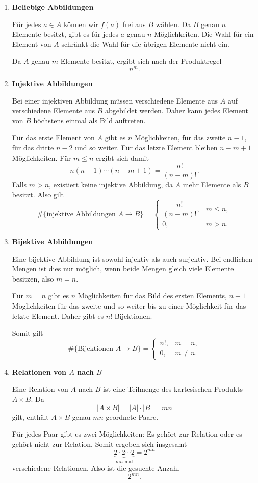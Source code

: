 \documentclass{report}
\begin{document}
\sol
\begin{enumerate}[label=(\alph*)]
  \item \textbf{Beliebige Abbildungen}

  Für jedes \(a\in A\) können wir \(f(a)\) frei aus \(B\) wählen. Da \(B\) genau \(n\) Elemente besitzt, gibt es für jedes \(a\) genau \(n\) Möglichkeiten. Die Wahl für ein Element von \(A\) schränkt die Wahl für die übrigen Elemente nicht ein.

  Da \(A\) genau \(m\) Elemente besitzt, ergibt sich nach der Produktregel
  \[
  \boxed{n^m}.
  \]

  \item \textbf{Injektive Abbildungen}

  Bei einer injektiven Abbildung müssen verschiedene Elemente aus \(A\) auf verschiedene Elemente aus \(B\) abgebildet werden. Daher kann jedes Element von \(B\) höchstens einmal als Bild auftreten.

  Für das erste Element von \(A\) gibt es \(n\) Möglichkeiten, für das zweite \(n-1\), für das dritte \(n-2\) und so weiter. Für das letzte Element bleiben \(n-m+1\) Möglichkeiten. Für \(m\le n\) ergibt sich damit
  \[
  n(n-1)\cdots(n-m+1)
  =\frac{n!}{(n-m)!}.
  \]
  Falls \(m>n\), existiert keine injektive Abbildung, da \(A\) mehr Elemente als \(B\) besitzt. Also gilt
  \[
  \boxed{
  \#\{\text{injektive Abbildungen }A\to B\}
  =
  \begin{cases}
  \dfrac{n!}{(n-m)!},&m\le n,\\[6pt]
  0,&m>n.
  \end{cases}}
  \]

  \item \textbf{Bijektive Abbildungen}

  Eine bijektive Abbildung ist sowohl injektiv als auch surjektiv. Bei endlichen Mengen ist dies nur möglich, wenn beide Mengen gleich viele Elemente besitzen, also \(m=n\).

  Für \(m=n\) gibt es \(n\) Möglichkeiten für das Bild des ersten Elements, \(n-1\) Möglichkeiten für das zweite und so weiter bis zu einer Möglichkeit für das letzte Element. Daher gibt es \(n!\) Bijektionen.

  Somit gilt
  \[
  \boxed{
  \#\{\text{Bijektionen }A\to B\}
  =
  \begin{cases}
  n!,&m=n,\\
  0,&m\ne n.
  \end{cases}}
  \]

  \item \textbf{Relationen von \(A\) nach \(B\)}

  Eine Relation von \(A\) nach \(B\) ist eine Teilmenge des kartesischen Produkts \(A\times B\). Da
  \[
  |A\times B|=|A|\cdot|B|=mn
  \]
  gilt, enthält \(A\times B\) genau \(mn\) geordnete Paare.

  Für jedes Paar gibt es zwei Möglichkeiten: Es gehört zur Relation oder es gehört nicht zur Relation. Somit ergeben sich insgesamt
  \[
  \underbrace{2\cdot2\cdots2}_{mn\text{-mal}}
  =2^{mn}
  \]
  verschiedene Relationen. Also ist die gesuchte Anzahl
  \[
  \boxed{2^{mn}}.
  \]
\end{enumerate}
\end{document}

